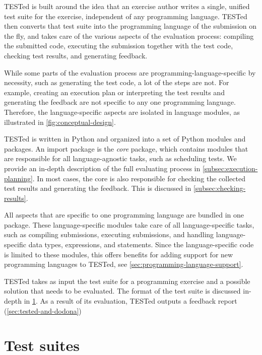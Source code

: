 \documentclass[../main]{subfiles}
\begin{document}
TESTed is built around the idea that an exercise author writes a single, unified test suite for the exercise, independent of any programming language.
TESTed then converts that test suite into the programming language of the submission on the fly, and takes care of the various aspects of the evaluation process: compiling the submitted code, executing the submission together with the test code, checking test results, and generating feedback.

While some parts of the evaluation process are programming-language-specific by necessity, such as generating the test code, a lot of the steps are not.
For example, creating an execution plan or interpreting the test results and generating the feedback are not specific to any one programming language.
Therefore, the language-specific aspects are isolated in language modules, as illustrated in \cref{fig:conceptual-design}.

\leavevmode{}%
TESTed is written in Python and organized into a set of Python modules and packages.
An import package is the \emph{core} package, which contains modules that are responsible for all language-agnostic tasks, such as scheduling tests.
We provide an in-depth description of the full evaluating process in \cref{subsec:execution-planning}.
In most cases, the core is also responsible for checking the collected test results and generating the feedback.
This is discussed in \cref{subsec:checking-results}.

All aspects that are specific to one programming language are bundled in one package.
These language-specific modules take care of all language-specific tasks, such as compiling submissions, executing submissions, and handling language-specific data types, expressions, and statements.
Since the language-specific code is limited to these modules, this offers benefits for adding support for new programming languages to TESTed, see \cref{sec:programming-language-support}.

TESTed takes as input the test suite for a programming exercise and a possible solution that needs to be evaluated.
The format of the test suite is discussed in-depth in \cref{sec:test-suites}.
As a result of its evaluation, TESTed outputs a feedback report (\cref{sec:tested-and-dodona})

\section{Test suites}\label{sec:test-suites}
\end{document}
